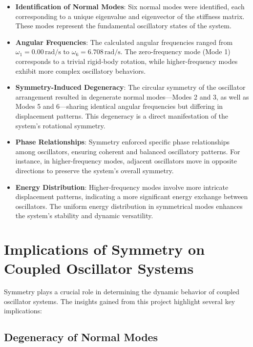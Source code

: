 \documentclass[12pt]{report} %
\begin{document}
\begin{itemize}
    \item \textbf{Identification of Normal Modes}: Six normal modes were identified, each corresponding to a unique eigenvalue and eigenvector of the stiffness matrix. These modes represent the fundamental oscillatory states of the system.

    \item \textbf{Angular Frequencies}: The calculated angular frequencies ranged from \( \omega_1 = 0.00 \, \text{rad/s} \) to \( \omega_6 = 6.708 \, \text{rad/s} \). The zero-frequency mode (Mode 1) corresponds to a trivial rigid-body rotation, while higher-frequency modes exhibit more complex oscillatory behaviors.

    \item \textbf{Symmetry-Induced Degeneracy}: The circular symmetry of the oscillator arrangement resulted in degenerate normal modes—Modes 2 and 3, as well as Modes 5 and 6—sharing identical angular frequencies but differing in displacement patterns. This degeneracy is a direct manifestation of the system's rotational symmetry.

    \item \textbf{Phase Relationships}: Symmetry enforced specific phase relationships among oscillators, ensuring coherent and balanced oscillatory patterns. For instance, in higher-frequency modes, adjacent oscillators move in opposite directions to preserve the system's overall symmetry.

    \item \textbf{Energy Distribution}: Higher-frequency modes involve more intricate displacement patterns, indicating a more significant energy exchange between oscillators. The uniform energy distribution in symmetrical modes enhances the system's stability and dynamic versatility.
\end{itemize}

\section{Implications of Symmetry on Coupled Oscillator Systems}
\label{sec:conclusion_symmetry_implications}

Symmetry plays a crucial role in determining the dynamic behavior of coupled oscillator systems. The insights gained from this project highlight several key implications:

\subsection{Degeneracy of Normal Modes}
\label{subsec:conclusion_degeneracy}
\end{document}
